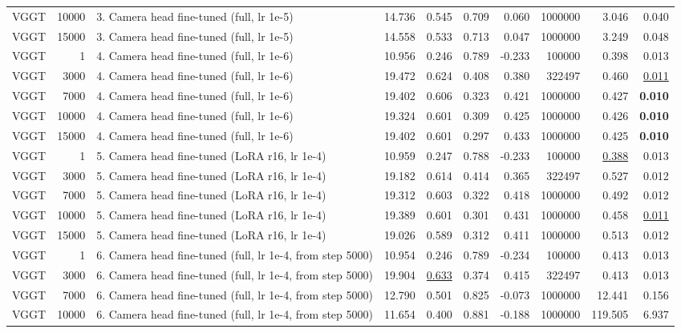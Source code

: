 \begin{table}[H]
\begin{tabular}{lrlrrrrrrr}
VGGT & 10000 & 3. Camera head fine-tuned (full, lr 1e-5) & 14.736 & 0.545 & 0.709 & 0.060 & 1000000 & 3.046 & 0.040 \\
VGGT & 15000 & 3. Camera head fine-tuned (full, lr 1e-5) & 14.558 & 0.533 & 0.713 & 0.047 & 1000000 & 3.249 & 0.048 \\
VGGT & 1 & 4. Camera head fine-tuned (full, lr 1e-6) & 10.956 & 0.246 & 0.789 & -0.233 & 100000 & 0.398 & 0.013 \\
VGGT & 3000 & 4. Camera head fine-tuned (full, lr 1e-6) & 19.472 & 0.624 & 0.408 & 0.380 & 322497 & 0.460 & \underline{0.011} \\
VGGT & 7000 & 4. Camera head fine-tuned (full, lr 1e-6) & 19.402 & 0.606 & 0.323 & 0.421 & 1000000 & 0.427 & \textbf{0.010} \\
VGGT & 10000 & 4. Camera head fine-tuned (full, lr 1e-6) & 19.324 & 0.601 & 0.309 & 0.425 & 1000000 & 0.426 & \textbf{0.010} \\
VGGT & 15000 & 4. Camera head fine-tuned (full, lr 1e-6) & 19.402 & 0.601 & 0.297 & 0.433 & 1000000 & 0.425 & \textbf{0.010} \\
VGGT & 1 & 5. Camera head fine-tuned (LoRA r16, lr 1e-4) & 10.959 & 0.247 & 0.788 & -0.233 & 100000 & \underline{0.388} & 0.013 \\
VGGT & 3000 & 5. Camera head fine-tuned (LoRA r16, lr 1e-4) & 19.182 & 0.614 & 0.414 & 0.365 & 322497 & 0.527 & 0.012 \\
VGGT & 7000 & 5. Camera head fine-tuned (LoRA r16, lr 1e-4) & 19.312 & 0.603 & 0.322 & 0.418 & 1000000 & 0.492 & 0.012 \\
VGGT & 10000 & 5. Camera head fine-tuned (LoRA r16, lr 1e-4) & 19.389 & 0.601 & 0.301 & 0.431 & 1000000 & 0.458 & \underline{0.011} \\
VGGT & 15000 & 5. Camera head fine-tuned (LoRA r16, lr 1e-4) & 19.026 & 0.589 & 0.312 & 0.411 & 1000000 & 0.513 & 0.012 \\
VGGT & 1 & 6. Camera head fine-tuned (full, lr 1e-4, from step 5000) & 10.954 & 0.246 & 0.789 & -0.234 & 100000 & 0.413 & 0.013 \\
VGGT & 3000 & 6. Camera head fine-tuned (full, lr 1e-4, from step 5000) & 19.904 & \underline{0.633} & 0.374 & 0.415 & 322497 & 0.413 & 0.013 \\
VGGT & 7000 & 6. Camera head fine-tuned (full, lr 1e-4, from step 5000) & 12.790 & 0.501 & 0.825 & -0.073 & 1000000 & 12.441 & 0.156 \\
VGGT & 10000 & 6. Camera head fine-tuned (full, lr 1e-4, from step 5000) & 11.654 & 0.400 & 0.881 & -0.188 & 1000000 & 119.505 & 6.937 \\

\end{tabular}
\end{table}
